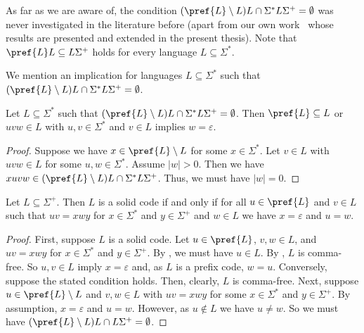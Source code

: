 \begin{remark}
	As far as we are aware of,
	the condition $(\pref{L} \setminus L) L \cap \Sigma^* L \Sigma^+ = \emptyset$
	was never investigated in the literature before (apart
	from our own work~\cite{DBLP:conf/fct/Hoffmann21} 
	whose results are presented and extended
	in the present thesis).
	Note that $\pref{L}L \subseteq L\Sigma^+$ holds for every language $L \subseteq \Sigma^*$.
\end{remark}

We mention an implication for languages  $L \subseteq \Sigma^*$
such that $(\pref{L} \setminus L) L \cap \Sigma^* L \Sigma^+ = \emptyset$.

\begin{proposition}
	Let $L \subseteq \Sigma^*$
	such that $(\pref{L} \setminus L) L \cap \Sigma^* L \Sigma^+ = \emptyset$.
	Then $\pref{L}\subseteq L$
	or $uvw \in L$ with $u,v \in \Sigma^*$ and $v \in L$ implies $w = \varepsilon$.
\end{proposition}
\begin{proof}
	Suppose we have  $x \in \pref{L} \setminus L$
	for some $x \in \Sigma^*$.
	Let $v \in L$
	with $uvw \in L$ for some $u,w \in \Sigma^*$.
	Assume $|w| > 0$.
	Then we have $xuvw \in (\pref{L}\setminus L) L \cap \Sigma^* L \Sigma^+$.
	Thus, we must have $|w| = 0$.
\end{proof}

\begin{theorem} \label{thm:solidcode-char2}
	Let $L \subseteq \Sigma^+$.
	Then $L$ is a solid code
	if and only if for all $u \in \pref{L}$ and $v \in L$
	such that $uv = xwy$ for  $x \in \Sigma^*$ and $y \in \Sigma^+$ and $w \in L$
	we have $x = \varepsilon$ and $u = w$.			
\end{theorem}
\begin{proof}
	First, suppose $L$ is a solid code.
	Let $u \in \pref{L}$, $v, w \in L$,
	and $uv = xwy$ for $x \in \Sigma^*$ and $y \in \Sigma^+$.	
	By , we must have $u \in L$.
	By , 
	$L$ is comma-free.
	So $u, v \in L$	imply $x = \varepsilon$ and, as $L$ is a prefix code, $w = u$.	
	Conversely, suppose the stated condition holds.
	Then, clearly, $L$ is comma-free.
	Next, suppose $u \in \pref{L} \setminus L$ and $v,w \in L$
	with $uv = xwy$ for some $x \in \Sigma^*$ and $y \in \Sigma^+$.
	By assumption, $x = \varepsilon$ and $u = w$.
	However, as $u \notin L$ we have $u \ne w$.
	So we must have $(\pref{L} \setminus L)L \cap L \Sigma^+ = \emptyset$.
\end{proof}

